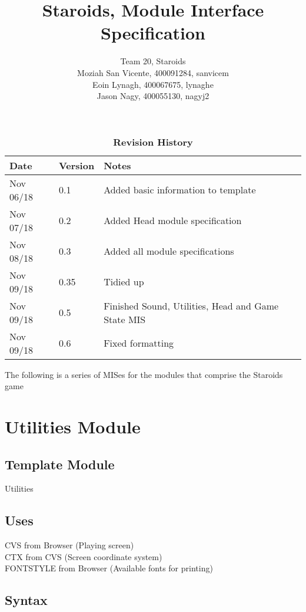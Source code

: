 \documentclass[12pt]{article}
\title{Staroids, Module Interface Specification}
\author{Team 20, Staroids
  \\ Moziah San Vicente, 400091284, sanvicem
  \\ Eoin Lynagh, 400067675, lynaghe
  \\ Jason Nagy, 400055130, nagyj2
}
\begin{document}
\maketitle

\begin{table}[bp]
\caption{\bf Revision History}
\begin{tabularx}{\textwidth}{p{3cm}p{2cm}X}
\toprule {\bf Date} & {\bf Version} & {\bf Notes}\\
\midrule
Nov 06/18 & 0.1 & Added basic information to template\\
Nov 07/18 & 0.2 & Added Head module specification\\
Nov 08/18 & 0.3 & Added all module specifications\\
Nov 09/18 & 0.35 & Tidied up\\
Nov 09/18 & 0.5 & Finished Sound, Utilities, Head and Game State MIS\\
Nov 09/18 & 0.6 & Fixed formatting\\
\bottomrule
\end{tabularx}
\end{table}

The following is a series of MISes for the modules that comprise the Staroids game

\newpage

\section*{Utilities Module}

\subsection*{Template Module}

Utilities

\subsection*{Uses}

CVS from Browser (Playing screen)\\
CTX from CVS (Screen coordinate system)\\
FONTSTYLE from Browser (Available fonts for printing)\\

\subsection*{Syntax}
\end{document}
